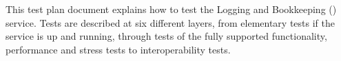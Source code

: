 This test plan document explains how to test the Logging and Bookkeeping (\LB)
service. Tests are described at six different layers, from elementary tests if
the service is up and running, through tests of the fully supported
functionality, performance and stress tests to interoperability tests.
